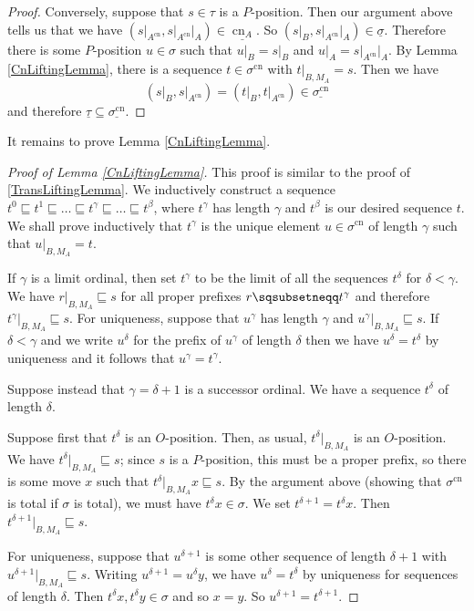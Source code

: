 \documentclass[11pt]{article} %
\theoremstyle{plain} %
\theoremstyle{definition} %
\theoremstyle{note}
\theoremstyle{exercisestyle}
\newcommand{\prefix}{\sqsubseteq}
\newcommand{\pprefix}{\sqsubsetneqq}
\newcommand{\grel}[1]{\underline{#1}}
\DeclareMathOperator{\cn}{cn}
\renewcommand{\subset}{\subseteq}
\begin{document}
\begin{proof}
  Conversely, suppose that $s\in\tau$ is a $P$-position.  Then our argument above tells us that we have $(s\vert_{A^{\cn}},s\vert_{A^{\cn}}\vert_A)\in\grel{\cn_A}$.  So $(s\vert_B,s\vert_{A^{\cn}}\vert_A)\in\grel\sigma$.  Therefore there is some $P$-position $u\in\sigma$ such that $u\vert_B=s\vert_B$ and $u\vert_A=s\vert_{A^{\cn}}\vert_A$.  By Lemma \ref{CnLiftingLemma}, there is a sequence $t\in\sigma^{\cn}$ with $t\vert_{B,M_A}=s$.  Then we have
  \[
    (s\vert_B,s\vert_{A^{\cn}})=(t\vert_B,t\vert_{A^{\cn}})\in\grel{\sigma^{\cn}}
    \]
  and therefore $\grel\tau\subset\grel{\sigma^{\cn}}$.  
\end{proof}

It remains to prove Lemma \ref{CnLiftingLemma}.  

\begin{proof}[Proof of Lemma \ref{CnLiftingLemma}]
  This proof is similar to the proof of \ref{TransLiftingLemma}.  We inductively construct a sequence $t^0\prefix t^1\prefix\dots\prefix t^\gamma\prefix\dots\prefix t^\beta$, where $t^\gamma$ has length $\gamma$ and $t^\beta$ is our desired sequence $t$.  We shall prove inductively that $t^\gamma$ is the unique element $u\in\sigma^{\cn}$ of length $\gamma$ such that $u\vert_{B,M_A}=t$.

  If $\gamma$ is a limit ordinal, then set $t^\gamma$ to be the limit of all the sequences $t^\delta$ for $\delta<\gamma$.  We have $r\vert_{B,M_A}\prefix s$ for all proper prefixes $r\pprefix t^{\gamma}$ and therefore $t^\gamma\vert_{B,M_A}\prefix s$.  For uniqueness, suppose that $u^\gamma$ has length $\gamma$ and $u^\gamma\vert_{B,M_A}\prefix s$.  If $\delta<\gamma$ and we write $u^\delta$ for the prefix of $u^\gamma$ of length $\delta$ then we have $u^\delta=t^\delta$ by uniqueness and it follows that $u^\gamma=t^\gamma$.

  Suppose instead that $\gamma=\delta+1$ is a successor ordinal.  We have a sequence $t^\delta$ of length $\delta$.  

  Suppose first that $t^\delta$ is an $O$-position.  Then, as usual, $t^\delta\vert_{B,M_A}$ is an $O$-position.  We have $t^\delta\vert_{B,M_A}\prefix s$; since $s$ is a $P$-position, this must be a proper prefix, so there is some move $x$ such that $t^\delta\vert_{B,M_A}x\prefix s$.  By the argument above (showing that $\sigma^{\cn}$ is total if $\sigma$ is total), we must have $t^\delta x\in\sigma$.  We set $t^{\delta+1}=t^\delta x$.  Then $t^{\delta+1}\vert_{B,M_A}\prefix s$.  

  For uniqueness, suppose that $u^{\delta+1}$ is some other sequence of length $\delta+1$ with $u^{\delta+1}\vert_{B,M_A}\prefix s$.  Writing $u^{\delta+1}=u^\delta y$, we have $u^{\delta}=t^\delta$ by uniqueness for sequences of length $\delta$.  Then $t^\delta x,t^\delta y\in\sigma$ and so $x=y$.  So $u^{\delta+1}=t^{\delta+1}$.  


\end{proof}
\end{document}
